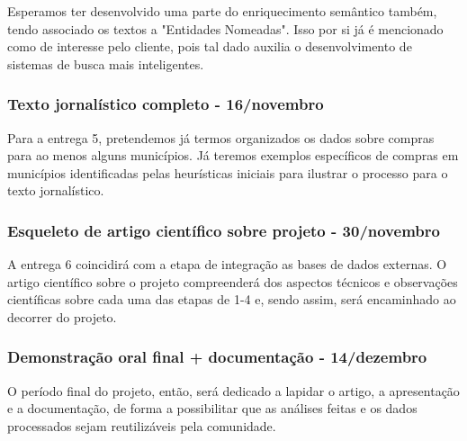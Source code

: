 \documentclass[10pt, a4paper]{article}
\begin{document}
Esperamos ter desenvolvido uma parte do enriquecimento semântico também, tendo associado os textos a "Entidades Nomeadas". Isso por si já é mencionado como de interesse pelo cliente, pois tal dado auxilia o desenvolvimento de sistemas de busca mais inteligentes. 


\subsubsection{Texto jornalístico completo - 16/novembro}

Para a entrega 5, pretendemos já termos organizados os dados sobre compras para ao menos alguns municípios. Já teremos exemplos específicos de compras em municípios identificadas pelas heurísticas iniciais para ilustrar o processo para o texto jornalístico.

\subsubsection{Esqueleto de artigo científico sobre projeto - 30/novembro}

A entrega 6 coincidirá com a etapa de integração as bases de dados externas. O artigo científico sobre o projeto compreenderá dos aspectos técnicos e observações científicas sobre cada uma das etapas de 1-4 e, sendo assim, será encaminhado ao decorrer do projeto. 

\subsubsection{Demonstração oral final + documentação - 14/dezembro}

O período final do projeto, então, será dedicado a lapidar o artigo, a apresentação e a documentação, de forma a possibilitar que as análises feitas e os dados processados sejam reutilizáveis pela comunidade. 
\end{document}
